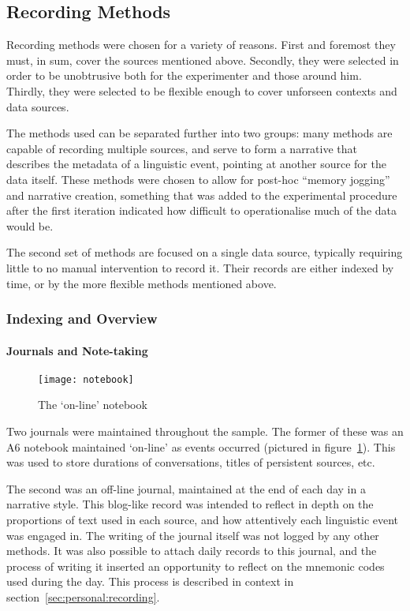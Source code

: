 \subsection{Recording Methods}
Recording methods were chosen for a variety of reasons.  First and foremost they must, in sum, cover the sources mentioned above.  Secondly, they were selected in order to be unobtrusive both for the experimenter and those around him.  Thirdly, they were selected to be flexible enough to cover unforseen contexts and data sources.

The methods used can be separated further into two groups: many methods are capable of recording multiple sources, and serve to form a narrative that describes the metadata of a linguistic event, pointing at another source for the data itself.  These methods were chosen to allow for post-hoc ``memory jogging'' and narrative creation, something that was added to the experimental procedure after the first iteration indicated how difficult to operationalise much of the data would be.

The second set of methods are focused on a single data source, typically requiring little to no manual intervention to record it.  Their records are either indexed by time, or by the more flexible methods mentioned above.


\subsubsection{Indexing and Overview}
\paragraph{Journals and Note-taking}

\begin{figure}[p]
\centering
\texttt{[image: notebook]}
\caption{The `on-line' notebook}
\label{fig:personal:online_notebook}
\end{figure}

Two journals were maintained throughout the sample.  The former of these was an A6 notebook maintained `on-line' as events occurred (pictured in figure~\ref{fig:personal:online_notebook}).  This was used to store durations of conversations, titles of persistent sources, etc.

The second was an off-line journal, maintained at the end of each day in a narrative style.  This blog-like record was intended to reflect in depth on the proportions of text used in each source, and how attentively each linguistic event was engaged in.  The writing of the journal itself was not logged by any other methods.  It was also possible to attach daily records to this journal, and the process of writing it inserted an opportunity to reflect on the mnemonic codes used during the day.  This process is described in context in section~\ref{sec:personal:recording}.

